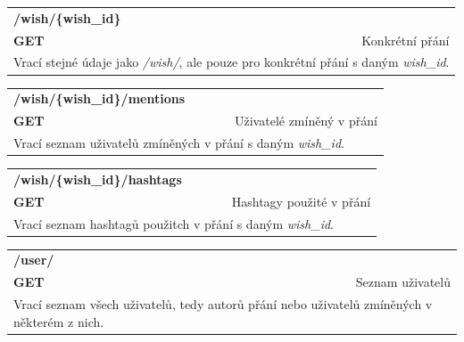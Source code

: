 \documentclass[thesis=B,czech]{FITthesis}[2012/06/26]
\begin{document}
\begin{table}[h]
\begin{tabular}{llllr}
\rowcolor[HTML]{EFEFEF}
\large \textbf{/wish/\{wish\_id\}}        &         &                 &        & \multicolumn{1}{l}{}                \\
\rowcolor[HTML]{EFEFEF}
\textbf{GET}          &         &                 &        & Konkrétní přání                        \\
\multicolumn{5}{l}{\parbox[t]{12.8cm}{Vrací stejné údaje jako \textit{/wish/}, ale pouze pro konkrétní přání s daným \textit{wish\_id}.}  } \\  
\end{tabular}
\end{table}
 

\begin{table}[h]
\begin{tabular}{llllr}
\rowcolor[HTML]{EFEFEF}
\large \textbf{/wish/\{wish\_id\}/mentions}        &         &                 &        & \multicolumn{1}{l}{}                \\
\rowcolor[HTML]{EFEFEF}
\textbf{GET}          &         &                 &        & Uživatelé zmíněný v přání                        \\
\multicolumn{5}{l}{\parbox[t]{12.8cm}{Vrací seznam uživatelů zmíněných v přání s daným \textit{wish\_id}.}  } \\    
\end{tabular}
\end{table}


\begin{table}[h]
\begin{tabular}{llllr}
\rowcolor[HTML]{EFEFEF}
\large \textbf{/wish/\{wish\_id\}/hashtags}        &         &                 &        & \multicolumn{1}{l}{}                \\
\rowcolor[HTML]{EFEFEF}
\textbf{GET}          &         &                 &        & Hashtagy použité v přání                        \\
\multicolumn{5}{l}{\parbox[t]{12.8cm}{Vrací seznam hashtagů použitch v přání s daným \textit{wish\_id}.}  } \\    
\end{tabular}
\end{table}

\begin{table}[h]
\begin{tabular}{llllr}
\rowcolor[HTML]{EFEFEF}
\large \textbf{/user/}        &         &                 &        & \multicolumn{1}{l}{}                \\
\rowcolor[HTML]{EFEFEF}
\textbf{GET}          &         &                 &        & Seznam uživatelů                        \\
\multicolumn{5}{l}{\parbox[t]{12.8cm}{Vrací seznam všech uživatelů, tedy autorů přání nebo uživatelů zmíněných v některém z nich. }  } \\   
\end{tabular}
\end{table}
\end{document}
